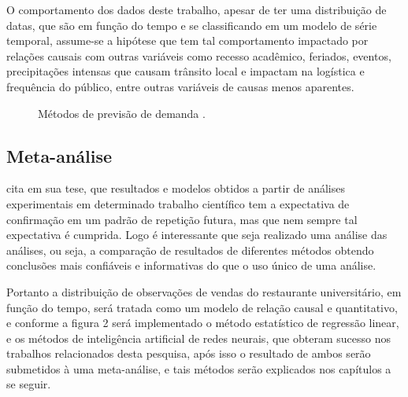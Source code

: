 \documentclass[	12pt, Times, openright, twoside, a4paper, english, brazil]{abntex2}
\begin{document}
          O comportamento dos dados deste trabalho, apesar de ter uma distribuição de datas, que são em função do tempo e se classificando em um modelo de série temporal, assume-se a hipótese que tem tal comportamento impactado por relações causais com outras variáveis como recesso acadêmico, feriados, eventos, precipitações intensas que causam trânsito local e impactam na logística e frequência do público, entre outras variáveis de causas menos aparentes.

          \begin{figure}[!ht]
          	\caption{Métodos de previsão de demanda \cite{Junior2007}.\label{fig:metodosPrevisaoDemanda}}
          \end{figure}

        \subsection{Meta-análise}
          \cite{Flavia2014} cita em sua tese, que resultados e modelos obtidos a partir de análises experimentais em determinado trabalho científico tem a expectativa de confirmação em um padrão de repetição futura, mas que nem sempre tal expectativa é cumprida. Logo é interessante que seja realizado uma análise das análises, ou seja, a comparação de resultados de diferentes métodos obtendo conclusões mais confiáveis e informativas do que o uso único de uma análise.

          Portanto a distribuição de observações de vendas do restaurante universitário, em função do tempo, será tratada como um modelo de relação causal e quantitativo, e conforme a figura 2 será implementado o método estatístico de regressão linear, e os métodos de inteligência artificial de redes neurais, que obteram sucesso nos trabalhos relacionados desta pesquisa, após isso o resultado de ambos serão submetidos à uma meta-análise, e tais métodos serão explicados nos capítulos a se seguir.
\end{document}
